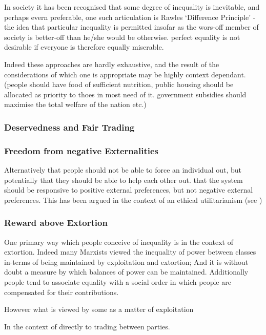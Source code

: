 In society it has been recognised that some degree of inequality is inevitable, and perhaps evern preferable, one such articulation is Rawles `Difference Principle' - the idea that particular inequality is permitted insofar as the wors-off member of society is better-off than he/she would be otherwise.
perfect equality is not desirable if everyone is therefore equally miserable.

Indeed these approaches are hardly exhaustive, and the result of the considerations of which one is appropriate may be highly context dependant. (people should have food of sufficient nutrition, public housing should be allocated as priority to thoes in most need of it. government subsidies should maximise the total welfare of the nation etc.) 


\subsubsection{Deservedness and Fair Trading}



\subsubsection{Freedom from negative Externalities}

Alternatively that people should not be able to force an individual out, but potentially that they should be able to help each other out.
that the system should be responsive to positive external preferences, but not negative external preferences.
This has been argued in the context of an ethical utilitarianism (see \cite{kymlicka2002contemporary})

\subsubsection{Reward above Extortion}

One primary way which people conceive of inequality is in the context of extortion. Indeed many Marxists viewed the inequality of power between classes in-terms of being maintained by exploitation and extortion; And it is without doubt a measure by which balances of power can be maintained. Additionally people tend to associate equality with a social order in which people are compensated for their contributions.

However what is viewed by some as a matter of exploitation

In the context of directly to trading between parties.

